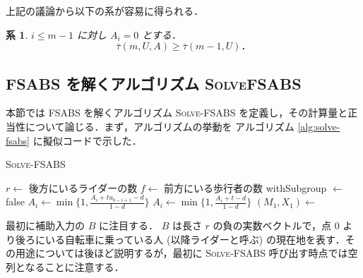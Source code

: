 \documentclass[11pt,a4paper]{jarticle}
\newtheorem{corollary}{系}
\newcommand\algref[1]{アルゴリズム \ref{alg:#1}}
\begin{document}
上記の議論から以下の系が容易に得られる．
\begin{corollary}
  $i \leq m - 1$ に対し $A_i = 0$ とする．
  \begin{equation}
    \bar\tau(m, U, A) \geq \bar\tau(m - 1, U)．
  \end{equation}
\end{corollary}

\subsection{FSABS を解くアルゴリズム \textsc{SolveFSABS}}

本節では FSABS を解くアルゴリズム \textsc{Solve-FSABS} を定義し，その計算量と正当性について論じる．まず，アルゴリズムの挙動を \algref{solve-fsabs} に擬似コードで示した．
\IncMargin{0.8em}
\begin{algorithm}
  \caption{\textsc{Solve-FSABS}}\label{alg:solve-fsabs}
  \SetInd{0.25em}{0.25em}

  $r \gets$ 後方にいるライダーの数\;
  $f \gets$ 前方にいる歩行者の数\;
  withSubgroup $\gets$ false\;
   {
    $A_i \gets \min \{1, \frac{A_i + tu_{b - i + 1} - d}{1 - d}\}$\;
  }
   {
    $A_i \gets \min \{1, \frac{A_i + t - d}{1 - d}\}$\;
  }
  $(M_1, X_1) \gets$ \;
  \Return {}\;
\end{algorithm}
\DecMargin{0.8em}
最初に補助入力の $B$ に注目する． $B$ は長さ $r$ の負の実数ベクトルで，点 0 より後ろにいる自転車に乗っている人 (以降ライダーと呼ぶ) の現在地を表す．その用途については後ほど説明するが，最初に \textsc{Solve-FSABS} 呼び出す時点では空列となることに注意する．
\end{document}
